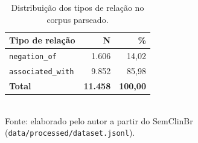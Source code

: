 \begin{table}[htbp]
  \centering
  \caption{Distribuição dos tipos de relação no corpus parseado.}
  \label{tab:distribuicao}
  \begin{tabular}{lrr}
  \toprule
  Tipo de relação & N & \% \\
  \midrule
  \texttt{negation\_of} & 1.606 & 14,02 \\
  \texttt{associated\_with} & 9.852 & 85,98 \\
  \midrule
  \textbf{Total} & \textbf{11.458} & \textbf{100,00} \\
  \bottomrule
  \end{tabular}
  \\[4pt]
  {\footnotesize Fonte: elaborado pelo autor a partir do SemClinBr (\texttt{data/processed/dataset.jsonl}).}
\end{table}
